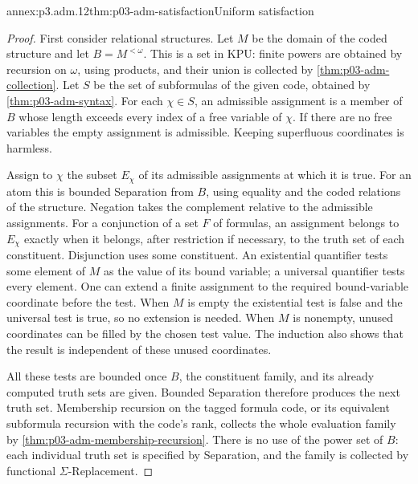 \begin{annexitem}{annex:p3.adm.12}{thm:p03-adm-satisfaction}{Uniform satisfaction}
\begin{proof}
First consider relational structures. Let \(M\) be the domain of the
coded structure and let \(B=M^{<\omega}\). This is a set in KPU:
finite powers are obtained by recursion on \(\omega\), using products,
and their union is collected by \cref{thm:p03-adm-collection}. Let
\(S\) be the set of subformulas of the given code, obtained by
\cref{thm:p03-adm-syntax}. For each \(\chi\in S\), an admissible
assignment is a member of \(B\) whose length exceeds every index of a
free variable of \(\chi\). If there are no free variables the empty
assignment is admissible. Keeping superfluous coordinates is harmless.

Assign to \(\chi\) the subset \(E_\chi\) of its admissible assignments
at which it is true. For an atom this is bounded Separation from \(B\),
using equality and the coded relations of the structure. Negation takes
the complement relative to the admissible assignments. For a conjunction
of a set \(F\) of formulas, an assignment belongs to \(E_\chi\) exactly
when it belongs, after restriction if necessary, to the truth set of
each constituent. Disjunction uses some constituent. An existential
quantifier tests some element of \(M\) as the value of its bound
variable; a universal quantifier tests every element. One can extend a
finite assignment to the required bound-variable coordinate before the
test. When \(M\) is empty the existential test is false and the universal
test is true, so no extension is needed. When \(M\) is nonempty, unused
coordinates can be filled by the chosen test value. The induction also
shows that the result is independent of these unused coordinates.

All these tests are bounded once \(B\), the constituent family, and
its already computed truth sets are given. Bounded Separation therefore
produces the next truth set. Membership recursion on the tagged formula
code, or its equivalent subformula recursion with the code's rank,
collects the whole evaluation family by
\cref{thm:p03-adm-membership-recursion}. There is no use of the power
set of \(B\): each individual truth set is specified by Separation,
and the family is collected by functional \(\Sigma\)-Replacement.


\end{proof}
\end{annexitem}
